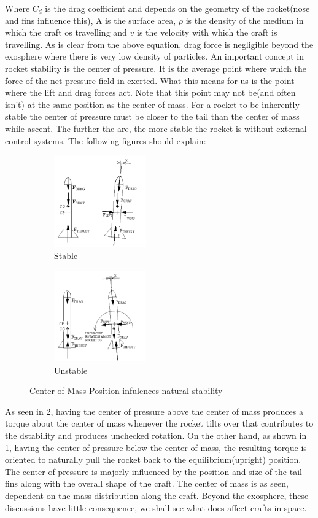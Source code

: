 \documentclass[12pt, letterpaper]{article}
\begin{document}
Where $C_d$ is the drag coefficient and depends on the geometry of the rocket(nose and fins influence this), A is the surface area, $\rho$ is the density of the medium in which the craft os travelling and $v$ is the velocity with which the craft is travelling. As is clear from the above equation, drag force is negligible beyond the exosphere where there is very low density of particles. An important concept in rocket stability is the center of pressure. It is the average point where which the force of the net pressure field in exerted. What this means for us is the point where the lift and drag forces act. Note that this point may not be(and often isn't) at the same position as the center of mass. For a rocket to be inherently stable the center of pressure must be closer to the tail than the center of mass while ascent. The further the are, the more stable the rocket is without external control systems. The following figures should explain:

\begin{figure}[h!]
\centering
\begin{subfigure}{.5\textwidth}
  \centering
  \includegraphics[width=150px]{stable}
  \caption{Stable}
  \label{fig:stable}
\end{subfigure}%
\begin{subfigure}{.5\textwidth}
  \centering
  \includegraphics[width=150px]{unstable}
  \caption{Unstable}
  \label{fig:unstable}
\end{subfigure}
\caption{Center of Mass Position infulences natural stability}
\label{fig:COP}
\end{figure}

As seen in \ref{fig:unstable}, having the center of pressure above the center of mass produces a torque about the center of mass whenever the rocket tilts over that contributes to the dstability and produces unchecked rotation. On the other hand, as shown in \ref{fig:stable}, having the center of pressure below the center of mass, the resulting torque is oriented to naturally pull the rocket back to the equilibrium(upright) position. The center of pressure is majorly influenced by the position and size of the tail fins along with the overall shape of the craft. The center of mass is as seen, dependent on the mass distribution along the craft. Beyond the exosphere, these discussions have little consequence, we shall see what does affect crafts in space.
\end{document}
